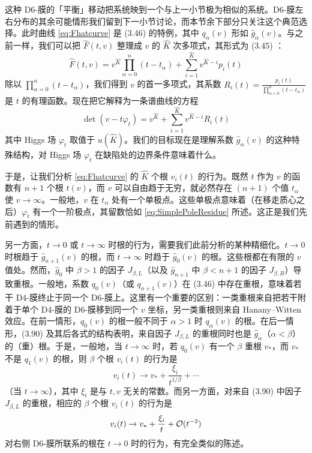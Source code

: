 这种 D6-膜的「平衡」移动把系统映到一个与上一小节极为相似的系统。D6-膜左右分布的其余可能情形我们留到下一小节讨论，而本节余下部分只关注这个典范选择。此时曲线 \eqref{eq:Fhatcurve} 是 (3.46)%
的特例，其中 $q_\alpha(v)$ 形如 $\hat g_\alpha(v)$。与之前一样，我们可以把 $\hat F(t,v)$ 整理成 $v$ 的 $\hat K$ 次多项式，其形式为 (3.45)%
：
\begin{equation}\label{eq:ch05-Fhatmonic}
\hat F(t,v) = v^{\hat K} \prod_{\alpha=0}^n(t-t_\alpha) + \sum_{i=1}^{\hat
K} v^{\hat K-i} p_i(t) 
\end{equation}
除以 $\prod_{\alpha=0}^n(t-t_\alpha)$，我们得到 $v$ 的首一多项式，其系数 $R_i(t) =
\frac{p_i(t)}{\prod_{\alpha=0}^n(t-t_\alpha)}$ 是 $t$ 的有理函数。现在把它解释为一条谱曲线的方程
\begin{equation}\label{eq:ch05-detspectral}
\det(v- t \varphi_t) =  v^{\hat K}   + \sum_{i=1}^{\hat K} v^{\hat
K-i} R_i(t)
\end{equation}
其中 Higgs 场 $\varphi_t$ 取值于 $u(\hat K)$。我们的目标现在是理解系数 $\hat g_\alpha(v)$ 的这种特殊结构，对 Higgs 场 $\varphi_t$ 在缺陷处的边界条件意味着什么。

于是，让我们分析 \eqref{eq:Fhatcurve} 的 $\hat K$ 个根 $v_i(t)$ 的行为。既然 $t$ 作为 $v$ 的函数有 $n+1$ 个根 $t(v)$，而 $v$ 可以自由趋于无穷，就必然存在 $(n+1)$ 个值 $t_\alpha$ 使 $v\to \infty$。一般地，$v$ 在 $t_\alpha$ 处有一个单极点。这些单极点意味着（在移走质心之后）$\varphi_t$ 有一个一阶极点，其留数恰如 \eqref{eq:SimplePoleResidue} 所述。这正是我们先前遇到的情形。

另一方面，$t\to 0$ 或 $t\to \infty$ 时根的行为，需要我们此前分析的某种精细化。$t\to 0$ 时根趋于 $\hat g_{n+1}(v)$ 的根，而 $t\to \infty$ 时趋于 $\hat g_0(v)$ 的根。这些根都在有限的 $v$ 值处。然而，$\hat g_0$ 中 $\beta>1$ 的因子 $J_{\beta,L}$（以及 $\hat g_{n+1}$ 中 $\beta < n+1$ 的因子 $J_{\beta,R}$）导致重根。一般地，系数 $q_0(v)$（或 $q_{n+1}(v)$）在 (3.46)%
中存在重根，意味着若干 D4-膜终止于同一个 D6-膜上。这里有一个重要的区别：一类重根来自把若干附着于单个 D4-膜的 D6-膜移到同一个 $v$ 坐标，另一类重根则来自 Hanany–Witten 效应。在前一情形，$q_0(v)$ 的根一般不同于 $\alpha>1$ 时 $q_\alpha(v)$ 的根。在后一情形，(3.90)%
及其后各式的结构表明，来自因子 $J_{\beta,L}$ 的重根同时也是 $\hat g_{\alpha}$（$\alpha < \beta$）的（重）根。于是，一般地，当 $t \to \infty$ 时，若 $q_0(v)$ 有一个 $\beta$ 重根 $v_*$，而 $v_*$ 不是 $q_1(v)$ 的根，则 $\beta$ 个根 $v_i(t)$ 的行为是
\begin{equation}\label{eq:FracRootLimit}
v_i(t) \to v_* + \frac{\xi_i}{t^{1/\beta}} + \cdots
\end{equation}
（当 $t\to\infty$），其中 $\xi_i$ 是与 $t,v$ 无关的常数。而另一方面，对来自 (3.90)%
中因子 $J_{\beta,L}$ 的重根，相应的 $\beta$ 个根 $v_i(t)$ 的行为是
\begin{equation}\label{eq:WholeRootLimit}
v_i(t) \to v_* + \frac{\xi_i}{t}+ \mathcal{O}(t^{-2})
\end{equation}
对右侧 D6-膜所联系的根在 $t\to 0$ 时的行为，有完全类似的陈述。

